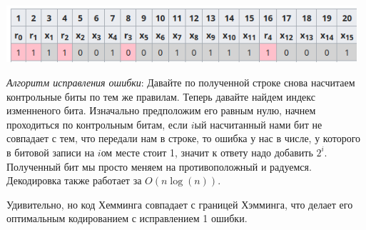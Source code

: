 \begin{center}
  \includegraphics[height=2.1cm]{assets/Hemming_code.png}
\end{center}

\textit{Алгоритм исправления ошибки}: Давайте по полученной строке снова насчитаем контрольные биты по тем же правилам. Теперь давайте найдем индекс изменненого бита. Изначально предположим его равным нулю, начнем проходиться по контрольным битам, если $i$ый насчитанный нами бит не совпадает с тем, что передали нам в строке, то ошибка у нас в числе, у которого в битовой записи на $i$ом месте стоит 1, значит к ответу надо добавить $2^i$. Полученный бит мы просто меняем на противоположный и радуемся. Декодировка также работает за $O(n\log(n))$.

Удивительно, но код Хемминга совпадает с границей Хэмминга, что делает его оптимальным кодированием с исправлением 1 ошибки.

